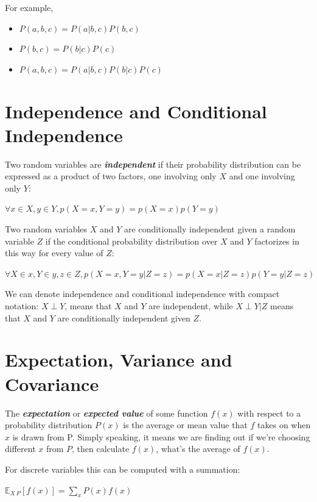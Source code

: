\documentclass{report}
\begin{document}
For example,\newline
\begin{itemize}
    \item $P(a,b,c) = P(a|b,c)P(b,c)$
    \item $P(b,c) = P(b|c)P(c)$
    \item $P(a,b,c) = P(a|b,c)P(b|c)P(c)$
\end{itemize}

\section{Independence and Conditional Independence}
Two random variables are \textbf{\textit{independent}} if their probability distribution can be expressed as a product of two factors, one involving only $X$ and one involving only $Y$:\newline\newline
\centerline{$\forall x \in X, y \in Y, p(X=x, Y=y) = p(X=x)p(Y=y)$}\newline\newline
Two random variables $X$ and $Y$ are conditionally independent given a random variable $Z$ if the conditional probability distribution over $X$ and $Y$ factorizes in this way for every value of $Z$:\newline\newline
\centerline{$\forall X \in x, Y \in y, z \in Z, p(X=x, Y=y | Z = z) = p(X=x | Z=z)p(Y=y | Z=z)$}\newline\newline
We can denote independence and conditional independence with compact notation: $X \perp Y$, means that $X$ and $Y$ are independent, while $X \perp Y | Z$ means that $X$ and $Y$ are conditionally independent given $Z$.\newline

\section{Expectation, Variance and Covariance}
The \textbf{\textit{expectation}} or \textbf{\textit{expected value}} of some function $f(x)$ with respect to a probability distribution $P(x)$ is the average or mean value that $f$ takes on when $x$ is drawn from P. Simply speaking, it means we are finding out if we're choosing different $x$ from $P$, then calculate $f(x)$, what's the average of $f(x)$.\newline

\noindent For discrete variables this can be computed with a summation:\newline\newline
\centerline{$\mathbb{E}_{X~P}[f(x)] = \sum_x P(x)f(x)$}\newline
\end{document}
